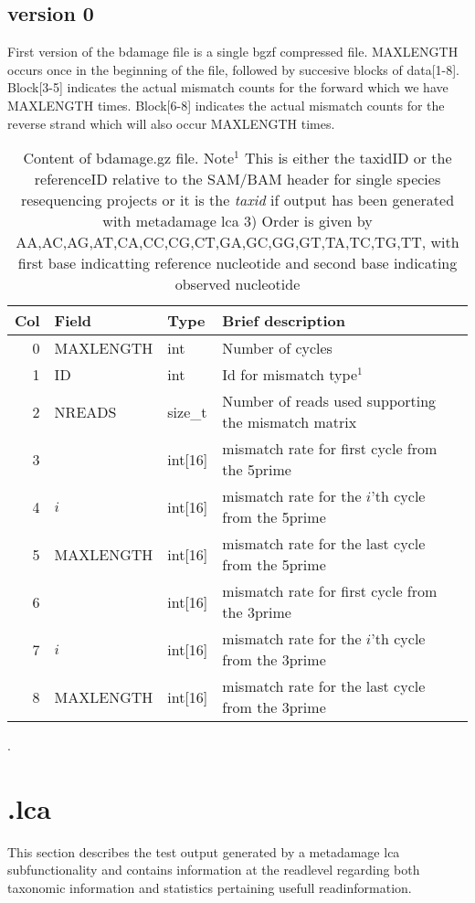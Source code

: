 \documentclass[10pt]{article}
\begin{document}
\subsection{version 0}
First version of the bdamage file is a single bgzf compressed file. MAXLENGTH occurs once in the beginning of the file, followed by succesive blocks of data[1-8]. Block[3-5] indicates the actual mismatch counts for the forward which we have MAXLENGTH times. Block[6-8] indicates the actual mismatch counts for the reverse strand which will also occur MAXLENGTH times. 
\begin{table}[h!]
\begin{tabular}{rllll}
  \hline
  {\bf Col} & {\bf Field} & {\bf Type} & {\bf Brief description} \\
  \hline
  0 & {\sf MAXLENGTH} & int &  Number of cycles\\\hline
  1 & {\sf ID} & int &  Id for mismatch type$^1$\\
  2 & {\sf NREADS} & size\_t & Number of reads used supporting the mismatch matrix\\\hline\hline
  3 & {\sf 1} & int[16] & mismatch rate for first cycle from the 5prime\\
  4 & {\sf $i$} & int[16] & mismatch rate for the $i$'th cycle from the 5prime\\
  5 & {\sf MAXLENGTH} & int[16] & mismatch rate for the last cycle from the 5prime\\\hline
  6 & {\sf 1} & int[16] & mismatch rate for first cycle from the 3prime\\
  7 & {\sf $i$} & int[16] & mismatch rate for the $i$'th cycle from the 3prime\\
  8 & {\sf MAXLENGTH} & int[16] & mismatch rate for the last cycle from the 3prime\\\hline
  \hline
\end{tabular}\label{tab1}
\caption{Content of bdamage.gz file. Note$^1$ This is either the taxidID or the referenceID relative to the SAM/BAM header for single species resequencing projects or it is the \textit{taxid} if output has been generated with metadamage lca 3) Order is given by AA,AC,AG,AT,CA,CC,CG,CT,GA,GC,GG,GT,TA,TC,TG,TT, with first base indicatting reference nucleotide and second base indicating observed nucleotide}.
\end{table}
 
\clearpage
\section{.lca} \label{sec:lca}
This section describes the test output generated by a metadamage lca subfunctionality and contains information at the readlevel regarding both taxonomic information and statistics pertaining usefull readinformation.\\
\end{document}
